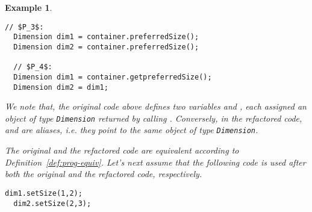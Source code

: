 \documentclass[10pt,conference]{IEEEtran}
\newtheorem{example}{Example}
\begin{document}
\begin{example}\label{ex:aliasing}
~\begin{lstlisting}[mathescape=true,showstringspaces=false]
  // $P_3$:
  Dimension dim1 = container.preferredSize();
  Dimension dim2 = container.preferredSize();    

  // $P_4$:
  Dimension dim1 = container.getpreferredSize();  
  Dimension dim2 = dim1;
\end{lstlisting}



    




We note that, the original code above defines two variables  and
, each assigned an object of type \texttt{Dimension} returned by calling
.
Conversely, in the refactored code,  and  are aliases, i.e. they point to the same
object of type \texttt{Dimension}.

The original and the refactored code are equivalent according to Definition~\ref{def:prog-equiv}.
Let's next assume that the following code
is used after both the original and the refactored code, respectively.

\begin{lstlisting}[mathescape=true,showstringspaces=false]
  dim1.setSize(1,2);
  dim2.setSize(2,3);  
\end{lstlisting}


\end{example}
\end{document}

